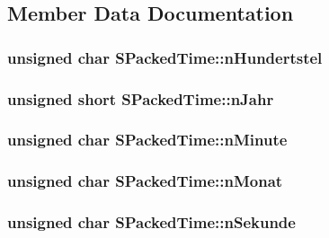 \subsection{Member Data Documentation}
\hypertarget{structSPackedTime_af7e388034b05904596751b2ce74898fc}{
\subsubsection[{n\-Hundertstel}]{\setlength{\rightskip}{0pt plus 5cm}unsigned char S\-Packed\-Time\-::n\-Hundertstel}}\label{structSPackedTime_af7e388034b05904596751b2ce74898fc}
\hypertarget{structSPackedTime_af4d875bb5c5cc62154cf51b21a75960d}{
\subsubsection[{n\-Jahr}]{\setlength{\rightskip}{0pt plus 5cm}unsigned short S\-Packed\-Time\-::n\-Jahr}}\label{structSPackedTime_af4d875bb5c5cc62154cf51b21a75960d}
\hypertarget{structSPackedTime_aebf8c14be45a04b5dfa28238e3cadf58}{
\subsubsection[{n\-Minute}]{\setlength{\rightskip}{0pt plus 5cm}unsigned char S\-Packed\-Time\-::n\-Minute}}\label{structSPackedTime_aebf8c14be45a04b5dfa28238e3cadf58}
\hypertarget{structSPackedTime_ae5a1caadb2082daa3f339093b8e3e88a}{
\subsubsection[{n\-Monat}]{\setlength{\rightskip}{0pt plus 5cm}unsigned char S\-Packed\-Time\-::n\-Monat}}\label{structSPackedTime_ae5a1caadb2082daa3f339093b8e3e88a}
\hypertarget{structSPackedTime_af0dddb792cfd2a63d50d6b476d77c5ea}{
\subsubsection[{n\-Sekunde}]{\setlength{\rightskip}{0pt plus 5cm}unsigned char S\-Packed\-Time\-::n\-Sekunde}}\label{structSPackedTime_af0dddb792cfd2a63d50d6b476d77c5ea}

